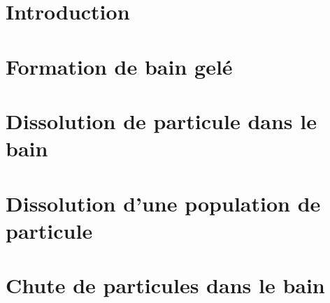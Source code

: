 \section{Introduction}
\label{sec:particle-introduction}


\section{Formation de bain gelé}
\label{sec:particle-freeze}


\section{Dissolution de particule dans le bain}
\label{sec-particle-dissolution}


\section{Dissolution d'une population de particule}
\label{sec:particle-population-dissolution}


\section{Chute de particules dans le bain}
\label{sec:particle-fall}

